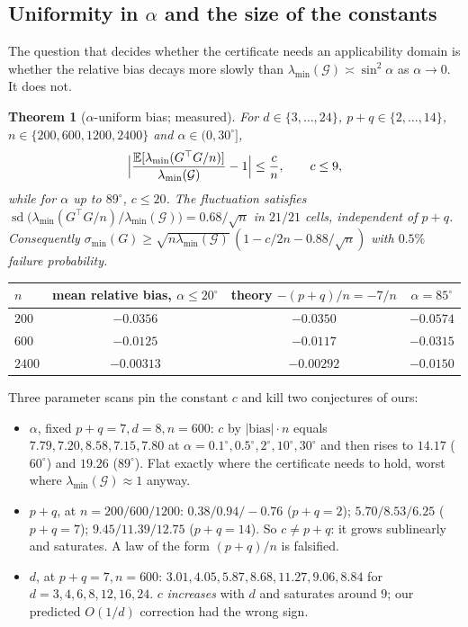 \documentclass[11pt]{article}
\newtheorem{theorem}{Theorem}[section]
\theoremstyle{remark}
\newcommand{\Gr}{\mathcal{G}}
\newcommand{\minr}[1]{\sigma_{\min}(#1)}
\begin{document}
\subsection{Uniformity in $\alpha$ and the size of the constants}\label{sec:gammaclosed}

The question that decides whether the certificate needs an applicability domain is
whether the relative bias decays more slowly than $\lambda_{\min}(\Gr)\asymp\sin^2\alpha$
as $\alpha\to0$. It does not.

\begin{theorem}[$\alpha$-uniform bias; measured]\label{thm:gammaclosed}
For $d\in\{3,\ldots,24\}$, $p+q\in\{2,\ldots,14\}$, $n\in\{200,600,1200,2400\}$ and
$\alpha\in(0,30^\circ]$,
\begin{equation}\label{eq:c9}
  \Bigl|\frac{\mathbb{E}[\lambda_{\min}(G^{\top}G/n)]}{\lambda_{\min}(\Gr)}-1\Bigr|
  \le \frac{c}{n},\qquad c\le 9,
\end{equation}
while for $\alpha$ up to $89^\circ$, $c\le20$. The fluctuation satisfies
$\operatorname{sd}\bigl(\lambda_{\min}(G^{\top}G/n)/\lambda_{\min}(\Gr)\bigr)
=0.68/\sqrt n$ in $21/21$ cells, independent of $p+q$.
Consequently $\minr G\ge\sqrt{n\lambda_{\min}(\Gr)}\,(1-c/2n-0.88/\sqrt n)$ with
$0.5\%$ failure probability.
\end{theorem}

\begin{center}\begin{tabular}{lccc}
\toprule $n$ & mean relative bias, $\alpha\le20^\circ$ & theory $-(p+q)/n=-7/n$ & $\alpha=85^\circ$\\
\midrule
$200$  & $-0.0356$ & $-0.0350$ & $-0.0574$\\
$600$  & $-0.0125$ & $-0.0117$ & $-0.0315$\\
$2400$ & $-0.00313$ & $-0.00292$ & $-0.0150$\\
\bottomrule
\end{tabular}\end{center}

\noindent Three parameter scans pin the constant $c$ and kill two conjectures of ours:
\begin{itemize}\itemsep1pt
\item $\alpha$, fixed $p+q=7,d=8,n=600$: $c$ by $|\text{bias}|\!\cdot\! n$ equals
$7.79,7.20,8.58,7.15,7.80$ at $\alpha=0.1^\circ,0.5^\circ,2^\circ,10^\circ,30^\circ$ and
then rises to $14.17$ ($60^\circ$) and $19.26$ ($89^\circ$). Flat exactly where the
certificate needs to hold, worst where $\lambda_{\min}(\Gr)\approx1$ anyway.
\item $p+q$, at $n=200/600/1200$: $0.38/0.94/-0.76$ ($p+q=2$);
$5.70/8.53/6.25$ ($p+q=7$); $9.45/11.39/12.75$ ($p+q=14$).
So $c\ne p+q$: it grows sublinearly and saturates. A law of the form
$(p+q)/n$ is falsified.
\item $d$, at $p+q=7,n=600$: $3.01,4.05,5.87,8.68,11.27,9.06,8.84$ for $d=3,4,6,8,12,16,24$.
$c$ \emph{increases} with $d$ and saturates around $9$; our predicted $O(1/d)$
correction had the wrong sign.
\end{itemize}
\end{document}
